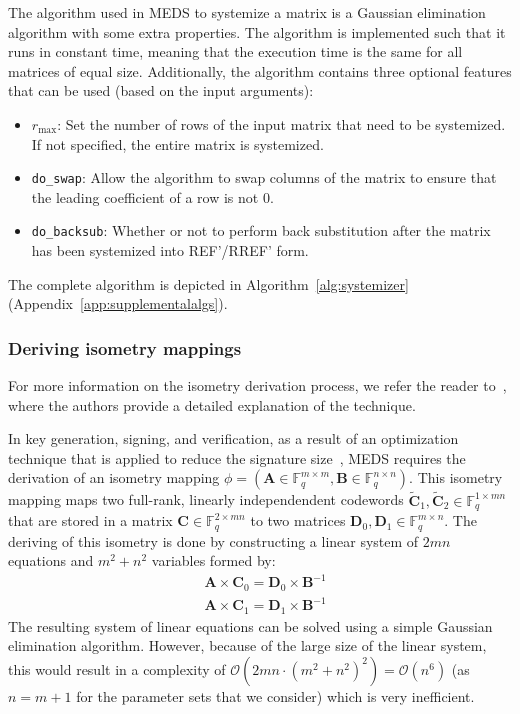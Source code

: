 \documentclass[11pt,a4paper]{report}
\theoremstyle{definition}
\begin{document}
The algorithm used in MEDS to systemize a matrix is a Gaussian elimination algorithm with some extra properties. The algorithm is implemented such that it runs in constant time, meaning that the execution time is the same for all matrices of equal size. Additionally, the algorithm contains three optional features that can be used (based on the input arguments):
\begin{itemize}
  \item $r_{\text{max}}$: Set the number of rows of the input matrix that need to be systemized. If not specified, the entire matrix is systemized.
  \item \texttt{\texttt{do\_swap}}: Allow the algorithm to swap columns of the matrix to ensure that the leading coefficient of a row is not 0.
  \item \texttt{do\_backsub}: Whether or not to perform back substitution after the matrix has been systemized into REF'/RREF' form.
\end{itemize}
The complete algorithm is depicted in Algorithm~\ref{alg:systemizer} (Appendix~\ref{app:supplementalalgs}).

\subsubsection{Deriving isometry mappings}
\label{sec:derivingisometry}
For more information on the isometry derivation process, we refer the reader to~\cite[Section~4.2]{chou2024reducing}, where the authors provide a detailed explanation of the technique.

In key generation, signing, and verification, as a result of an optimization technique that is applied to reduce the signature size~\cite{chou2024reducing}, MEDS requires the derivation of an isometry mapping $\phi = (\textbf{A} \in \mathbb{F}_q^{m \times m}, \textbf{B} \in \mathbb{F}_q^{n \times n})$. This isometry mapping maps two full-rank, linearly independendent codewords $\tilde{\textbf{C}}_1, \tilde{\textbf{C}}_2 \in \mathbb{F}_q^{1 \times mn}$ that are stored in a matrix $\textbf{C} \in \mathbb{F}_q^{2 \times mn}$ to two matrices $\textbf{D}_0, \textbf{D}_1 \in \mathbb{F}_q^{m \times n}$. The deriving of this isometry is done by constructing a linear system of $2mn$ equations and $m^2 + n^2$ variables formed by:
\begin{align*}
   & \textbf{A} \times \textbf{C}_0 = \textbf{D}_0 \times \textbf{B}^{-1} \\
   & \textbf{A} \times \textbf{C}_1 = \textbf{D}_1 \times \textbf{B}^{-1}
\end{align*}
The resulting system of linear equations can be solved using a simple Gaussian elimination algorithm. However, because of the large size of the linear system, this would result in a complexity of $\mathcal{O}(2mn \cdot (m^2 + n^2)^2) = \mathcal{O}(n^6)$ (as $n = m + 1$ for the parameter sets that we consider) which is very inefficient.
\end{document}
